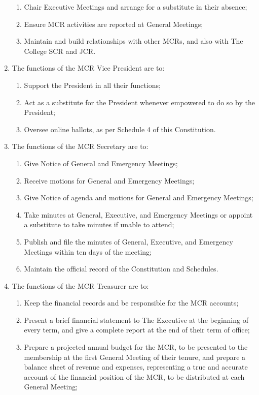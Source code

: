 \documentclass[11pt, a4paper]{article}
\begin{document}
\begin{enumerate}
\begin{enumerate}
        \item Chair Executive Meetings and arrange for a substitute in their absence;
        \item Ensure MCR activities are reported at General Meetings;
        \item Maintain and build relationships with other MCRs, and also with The College SCR and JCR.
    \end{enumerate}
    \item The functions of the MCR Vice President are to:
    \begin{enumerate}
        \item Support the President in all their functions;
        \item Act as a substitute for the President whenever empowered to do so by the President;
        \item Oversee online ballots, as per Schedule 4 of this Constitution.
    \end{enumerate}
    \item The functions of the MCR Secretary are to:
    \begin{enumerate}
        \item Give Notice of General and Emergency Meetings;
        \item Receive motions for General and Emergency Meetings;
        \item Give Notice of agenda and motions for General and Emergency Meetings;
        \item Take minutes at General, Executive, and Emergency Meetings or appoint a substitute to take minutes if unable to attend;
        \item Publish and file the minutes of General, Executive, and Emergency Meetings within ten days of the meeting;
        \item Maintain the official record of the Constitution and Schedules.
    \end{enumerate}
    \item The functions of the MCR Treasurer are to:
    \begin{enumerate}
        \item Keep the financial records and be responsible for the MCR accounts;
        \item Present a brief financial statement to The Executive at the beginning of every term, and give a complete report at the end of their term of office;
        \item Prepare a projected annual budget for the MCR, to be presented to the membership at the first General Meeting of their tenure, and prepare a balance sheet of revenue and expenses, representing a true and accurate account of the financial position of the MCR, to be distributed at each General Meeting;

\end{enumerate}
\end{enumerate}
\end{document}

